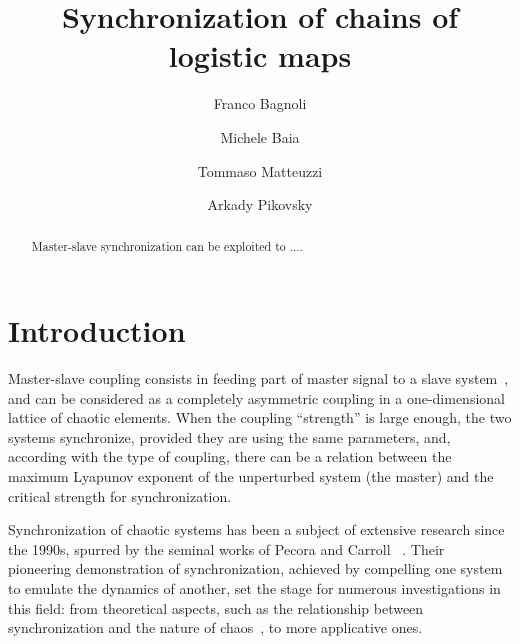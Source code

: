 \documentclass[runningheads]{llncs}
\begin{document}
%
\title{Synchronization of chains of  logistic maps}
%
%
\author{Franco Bagnoli  \and
Michele Baia \and
Tommaso Matteuzzi  \and
Arkady Pikovsky}
%
%

%
\maketitle              %
%
\begin{abstract}
Master-slave synchronization can be exploited to ....

\end{abstract}
%
%
%
\section{Introduction}
Master-slave coupling consists in feeding part of master signal to a slave system~\cite{Pecora2015}, and can be considered as a completely asymmetric coupling in a one-dimensional lattice of chaotic elements. When the coupling ``strength'' is large enough, the two systems synchronize, provided they are using the same parameters, and, according with the type of coupling, there can be a relation between the maximum Lyapunov exponent of the unperturbed system (the master) and the critical strength for synchronization. 

Synchronization of chaotic systems has been a subject of extensive research since the 1990s, spurred by the seminal works of Pecora and Carroll ~\cite{Pecora1990}. Their pioneering demonstration of synchronization, achieved by compelling one system to emulate the dynamics of another, set the stage for numerous investigations in this field: from theoretical aspects, such as the relationship between synchronization and the nature of chaos~\cite{Gupte1993}, to more applicative ones.
\end{document}

